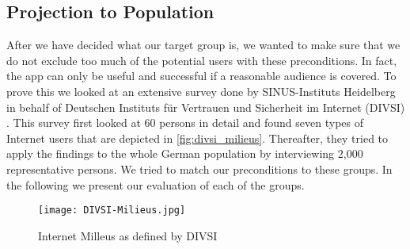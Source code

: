 \subsection{Projection to Population}
After we have decided what our target group is, we wanted to make sure that we do not exclude too much of the potential users with these preconditions.
In fact, the app can only be useful and successful if a reasonable audience is covered.
To prove this we looked at an extensive survey done by SINUS-Instituts Heidelberg in behalf of Deutschen Instituts f\"{u}r Vertrauen und Sicherheit im Internet (DIVSI) \cite{divsi2012divsi}.
This survey first looked at 60 persons in detail and found seven types of Internet users that are depicted in \autoref{fig:divsi_milieus}.
Thereafter, they tried to apply the findings to the whole German population by interviewing 2,000 representative persons.
We tried to match our preconditions to these groups. In the following we present our evaluation of each of the groups.

\begin{figure}[hHtbp]
\centering
\texttt{[image: DIVSI-Milieus.jpg]}
\caption{Internet Milleus as defined by DIVSI \cite{divsi2012divsi}}
\label{fig:divsi_milieus}
\end{figure}

